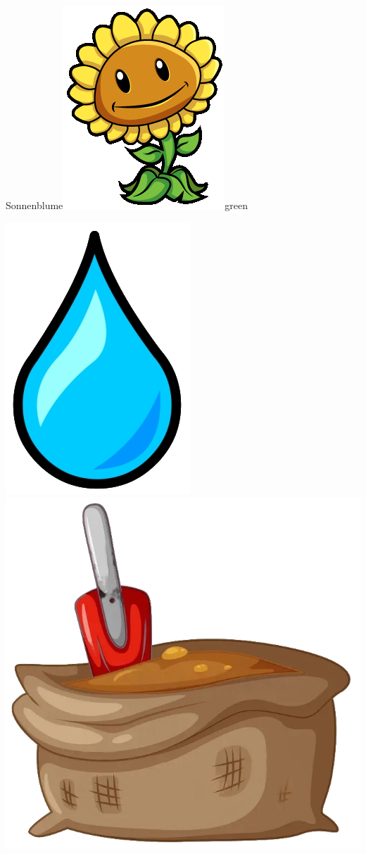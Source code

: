 \documentclass[11pt, a5paper]{article}
\def\now{\hspace{0.2cm}}
\begin{document}
\begin{mybox}{Sonnenblume}{\includegraphics[scale=0.1]{sunflower}}{green}
\begin{minipage}[t]{\textwidth}
			\now\includegraphics[scale=0.3]{water} 
			\now\includegraphics[scale=0.04]{dirt} 

\end{minipage}
\end{mybox}
\end{document}
